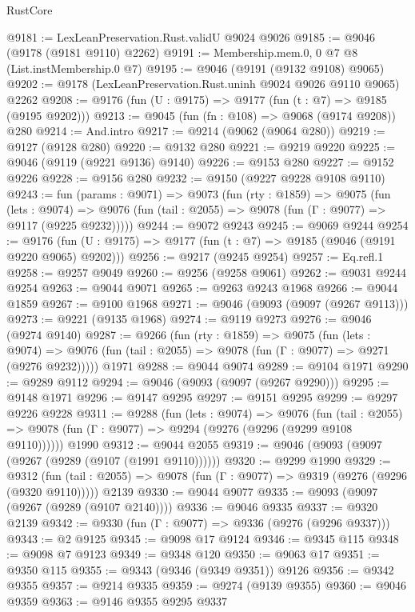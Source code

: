 \begin{lexlean}{RustCore}
\begin{coremodule}
@9181 := LexLeanPreservation.Rust.validU @9024 @9026
@9185 := @9046 (@9178 (@9181 @9110) @2262)
@9191 := Membership.mem.{0, 0} @7 @8 (List.instMembership.{0} @7)
@9195 := @9046 (@9191 (@9132 @9108) @9065)
@9202 := @9178 (LexLeanPreservation.Rust.uninh @9024 @9026 @9110 @9065) @2262
@9208 := @9176 (fun (U : @9175) => @9177 (fun (t : @7) => @9185 (@9195 @9202)))
@9213 := @9045 (fun (fn : @108) => @9068 (@9174 @9208)) @280
@9214 := And.intro
@9217 := @9214 (@9062 (@9064 @280))
@9219 := @9127 (@9128 @280)
@9220 := @9132 @280
@9221 := @9219 @9220
@9225 := @9046 (@9119 (@9221 @9136) @9140)
@9226 := @9153 @280
@9227 := @9152 @9226
@9228 := @9156 @280
@9232 := @9150 (@9227 @9228 @9108 @9110)
@9243 := fun (params : @9071) =>
  @9073
    (fun (rty : @1859) =>
    @9075
      (fun (lets : @9074) =>
      @9076 (fun (tail : @2055) => @9078 (fun (Γ : @9077) => @9117 (@9225 @9232)))))
@9244 := @9072 @9243
@9245 := @9069 @9244
@9254 := @9176 (fun (U : @9175) => @9177 (fun (t : @7) => @9185 (@9046 (@9191 @9220 @9065) @9202)))
@9256 := @9217 (@9245 @9254)
@9257 := Eq.refl.{1}
@9258 := @9257 @9049
@9260 := @9256 (@9258 @9061)
@9262 := @9031 @9244 @9254
@9263 := @9044 @9071
@9265 := @9263 @9243 @1968
@9266 := @9044 @1859
@9267 := @9100 @1968
@9271 := @9046 (@9093 (@9097 (@9267 @9113)))
@9273 := @9221 (@9135 @1968)
@9274 := @9119 @9273
@9276 := @9046 (@9274 @9140)
@9287 := @9266
    (fun (rty : @1859) =>
    @9075
      (fun (lets : @9074) =>
      @9076 (fun (tail : @2055) => @9078 (fun (Γ : @9077) => @9271 (@9276 @9232)))))
    @1971
@9288 := @9044 @9074
@9289 := @9104 @1971
@9290 := @9289 @9112
@9294 := @9046 (@9093 (@9097 (@9267 @9290)))
@9295 := @9148 @1971
@9296 := @9147 @9295
@9297 := @9151 @9295
@9299 := @9297 @9226 @9228
@9311 := @9288
    (fun (lets : @9074) =>
    @9076
      (fun (tail : @2055) => @9078 (fun (Γ : @9077) => @9294 (@9276 (@9296 (@9299 @9108 @9110))))))
    @1990
@9312 := @9044 @2055
@9319 := @9046 (@9093 (@9097 (@9267 (@9289 (@9107 (@1991 @9110))))))
@9320 := @9299 @1990
@9329 := @9312
    (fun (tail : @2055) => @9078 (fun (Γ : @9077) => @9319 (@9276 (@9296 (@9320 @9110)))))
    @2139
@9330 := @9044 @9077
@9335 := @9093 (@9097 (@9267 (@9289 (@9107 @2140))))
@9336 := @9046 @9335
@9337 := @9320 @2139
@9342 := @9330 (fun (Γ : @9077) => @9336 (@9276 (@9296 @9337)))
@9343 := @2 @9125
@9345 := @9098 @17 @9124
@9346 := @9345 @115
@9348 := @9098 @7 @9123
@9349 := @9348 @120
@9350 := @9063 @17
@9351 := @9350 @115
@9355 := @9343 (@9346 (@9349 @9351)) @9126
@9356 := @9342 @9355
@9357 := @9214 @9335
@9359 := @9274 (@9139 @9355)
@9360 := @9046 @9359
@9363 := @9146 @9355 @9295 @9337

\end{coremodule}
\end{lexlean}
